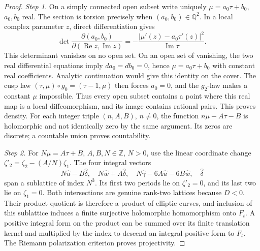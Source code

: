\documentclass[11pt,a4paper]{article}
\theoremstyle{plain}
\theoremstyle{definition}
\begin{document}
\begin{proof}
\par\noindent\textit{Step 1.} On a simply connected open subset write uniquely
\(\mu=a_0\tau+b_0\), \(a_0,b_0\) real. The section is torsion precisely
when \((a_0,b_0)\in\mathbb Q^2\). In a local complex parameter \(z\), direct
differentiation gives
\[
 \det\frac{\partial(a_0,b_0)}{\partial(\operatorname{Re}z,
 \operatorname{Im}z)}
 =-\frac{|\mu'(z)-a_0\tau'(z)|^2}{\operatorname{Im}\tau}.
\]
This determinant vanishes on no open set. On an open set of vanishing,
the two real differential equations imply \(da_0=db_0=0\), hence
\(\mu=a_0\tau+b_0\) with constant real coefficients. Analytic continuation
would give this identity on the cover. The cusp law
\((\tau,\mu)\circ g_0=(\tau-1,\mu)\) then forces \(a_0=0\), and the
\(g_2\)-law makes a constant \(\mu\) impossible. Thus every open subset
contains a point where this real map is a local diffeomorphism, and its
image contains rational pairs. This proves density. For each integer
triple \((n,A,B)\), \(n\ne0\), the function \(n\mu-A\tau-B\) is
holomorphic and not identically zero by the same argument. Its zeros are
discrete; a countable union proves countability.

\par\noindent\textit{Step 2.} For \(N\mu=A\tau+B\), \(A,B,N\in\mathbb Z\), \(N>0\), use the linear
coordinate change \(\zeta'_2=\zeta_2-(A/N)\zeta_1\).
The four integral vectors
\[
 N\widehat u-B\widehat\delta,\quad
 N\widehat w+A\widehat\delta,\quad
 N\widehat\gamma-6A\widehat u-6B\widehat w,\quad
 \widehat\delta
\]
span a sublattice of index \(N^3\). Its first two periods lie on
\(\zeta'_2=0\), and its last two lie on \(\zeta_1=0\).
Both intersections are genuine rank-two lattices because \(D<0\).
Their product quotient is therefore a product of elliptic curves, and
inclusion of this sublattice induces a finite surjective holomorphic
homomorphism onto \(F_t\). A positive integral form on the product can
be summed over its finite translation kernel and multiplied by the
index to descend an integral positive form to \(F_t\). The Riemann
polarization criterion proves projectivity.


\end{proof}
\end{document}
